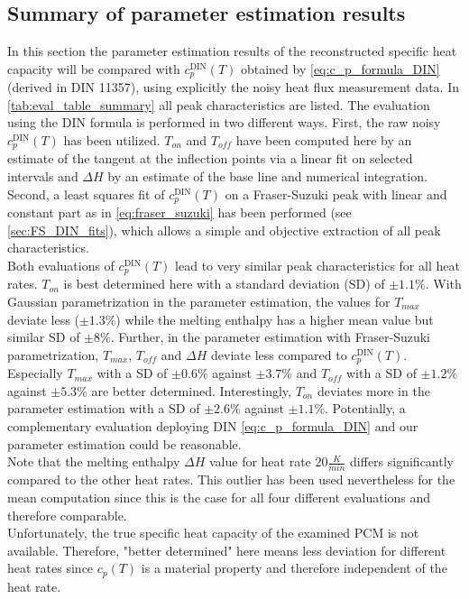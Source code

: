 \documentclass{scrartcl}[12pt, halfparskip]
\numberwithin{equation}{section}
\numberwithin{figure}{section}
\numberwithin{table}{section}
\begin{document}
\subsection{Summary of parameter estimation results}
\label{sec:param_estimation_summary}

In this section the parameter estimation results of the reconstructed specific heat capacity will be compared with $c_p^{\text{DIN}}(T)$ obtained by \cref{eq:c_p_formula_DIN} (derived in DIN 11357), using explicitly the noisy heat flux measurement data. 
In \cref{tab:eval_table_summary} all peak characteristics are listed. 
The evaluation using the DIN formula is performed in two different ways. 
First, the raw noisy $c_p^{\text{DIN}}(T)$ has been utilized. 
$T_{on}$ and $T_{off}$ have been computed here by an estimate of the tangent at the inflection points via a linear fit on selected intervals and $\Delta H$ by an estimate of the base line and numerical integration. 
Second, a least squares fit of $c_p^{\text{DIN}}(T)$ on a Fraser-Suzuki peak with linear and constant part as in \cref{eq:fraser_suzuki} has been performed (see \cref{sec:FS_DIN_fits}), which allows a simple and objective extraction of all peak characteristics.  \\
Both evaluations of $c_p^{\text{DIN}}(T)$ lead to very similar peak characteristics for all heat rates. $T_{on}$ is best determined here with a standard deviation (SD) of $\pm 1.1\%$. 
With Gaussian parametrization in the  parameter estimation, the values for $T_{max}$ deviate less ($\pm 1.3\%$) while the melting enthalpy has a higher mean value but similar SD of $\pm 8\%$. 
Further, in the parameter estimation with Fraser-Suzuki parametrization, $T_{max}$, $T_{off}$ and $\Delta H$ deviate less compared to $c_p^{\text{DIN}}(T)$. 
Especially $T_{max}$ with a SD of $\pm 0.6\%$ against $\pm 3.7\%$ and $T_{off}$ with a SD of $\pm 1.2\%$ against $\pm 5.3 \%$ are better determined. 
Interestingly, $T_{on}$ deviates more in the parameter estimation with a SD of $\pm 2.6\%$ against $\pm 1.1\%$. 
Potentially, a complementary evaluation deploying DIN \cref{eq:c_p_formula_DIN} and our parameter estimation could be reasonable. \\
Note that the melting enthalpy $\Delta H$ value for heat rate $20 \frac{K}{min}$ differs significantly compared to the other heat rates. 
This outlier has been used nevertheless for the mean computation since this is the case for all four different evaluations and therefore comparable. \\
Unfortunately, the true specific heat capacity of the examined PCM is not available. Therefore, "better determined" here means less deviation for different heat rates since $c_p(T)$ is a material property and therefore independent of the heat rate.
\end{document}
